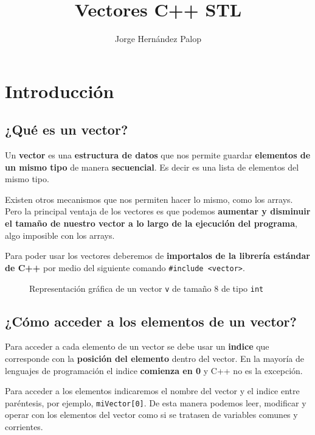 \documentclass{article}
\title{Vectores C++ STL}
\author{Jorge Hernández Palop}
\begin{document}
    \maketitle
    \section{Introducción}
    \subsection{¿Qué es un vector?}

    Un \textbf{vector} es una \textbf{estructura de datos} que nos permite guardar \textbf{elementos de un mismo
    tipo} de manera \textbf{secuencial}. Es decir es una lista de elementos del mismo tipo. 

    Existen otros mecanismos que nos permiten hacer lo mismo, como los arrays. Pero la principal ventaja
    de los vectores es que podemos \textbf{aumentar y disminuir el tamaño de nuestro vector a lo largo de 
    la ejecución del programa}, algo imposible con los arrays.

    Para poder usar los vectores deberemos de \textbf{importalos de la librería estándar de C++} 
    por medio del siguiente comando \texttt{\#include <vector>}.
    
    \begin{figure}[h]
        \centering
        \caption{Representación gráfica de un vector \texttt{v} de tamaño 8  de tipo \texttt{int}}
    \end{figure}

    \subsection{¿Cómo acceder a los elementos de un vector?}


    Para acceder a cada elemento de un vector se debe usar un \textbf{indice} que corresponde con la \textbf{posición
    del elemento} dentro del vector. En la mayoría de lenguajes de programación el indice \textbf{comienza en 0}
    y C++ no es la excepción.
    
    Para acceder a los elementos indicaremos el nombre del vector y el indice entre paréntesis,
    por ejemplo, \texttt{miVector[0]}. De esta manera podemos leer, modificar y operar con los elementos
    del vector como si se tratasen de variables comunes y corrientes. 
\end{document}
